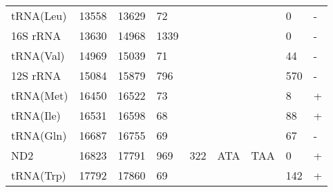 \documentclass[../DISSERTACAO_MAIN.tex]{subfiles}
\begin{document}
\begin{longtable}{llllllllllllllllllllll}
			tRNA(Leu)    & 13558          & \multicolumn{2}{l}{13629} & \multicolumn{2}{l}{72}         & \multicolumn{3}{l}{}                          & \multicolumn{3}{l}{}              & \multicolumn{3}{l}{}      & \multicolumn{3}{l}{0}           & \multicolumn{4}{l}{-}                  \\
			16S 				rRNA & 13630          & \multicolumn{2}{l}{14968} & \multicolumn{2}{l}{1339}       & \multicolumn{3}{l}{}                          & \multicolumn{3}{l}{}              & \multicolumn{3}{l}{}      & \multicolumn{3}{l}{0}           & \multicolumn{4}{l}{-}                  \\
			tRNA(Val)    & 14969          & \multicolumn{2}{l}{15039} & \multicolumn{2}{l}{71}         & \multicolumn{3}{l}{}                          & \multicolumn{3}{l}{}              & \multicolumn{3}{l}{}      & \multicolumn{3}{l}{44}          & \multicolumn{4}{l}{-}                  \\
			12S 				rRNA & 15084          & \multicolumn{2}{l}{15879} & \multicolumn{2}{l}{796}        & \multicolumn{3}{l}{}                          & \multicolumn{3}{l}{}              & \multicolumn{3}{l}{}      & \multicolumn{3}{l}{570}         & \multicolumn{4}{l}{-}                  \\
			tRNA(Met)    & 16450          & \multicolumn{2}{l}{16522} & \multicolumn{2}{l}{73}         & \multicolumn{3}{l}{}                          & \multicolumn{3}{l}{}              & \multicolumn{3}{l}{}      & \multicolumn{3}{l}{8}           & \multicolumn{4}{l}{+}                  \\
			tRNA(Ile)    & 16531          & \multicolumn{2}{l}{16598} & \multicolumn{2}{l}{68}         & \multicolumn{3}{l}{}                          & \multicolumn{3}{l}{}              & \multicolumn{3}{l}{}      & \multicolumn{3}{l}{88}          & \multicolumn{4}{l}{+}                  \\
			tRNA(Gln)    & 16687          & \multicolumn{2}{l}{16755} & \multicolumn{2}{l}{69}         & \multicolumn{3}{l}{}                          & \multicolumn{3}{l}{}              & \multicolumn{3}{l}{}      & \multicolumn{3}{l}{67}          & \multicolumn{4}{l}{-}                  \\
			ND2          & 16823          & \multicolumn{2}{l}{17791} & \multicolumn{2}{l}{969}        & \multicolumn{3}{l}{322}                       & \multicolumn{3}{l}{ATA}           & \multicolumn{3}{l}{TAA}   & \multicolumn{3}{l}{0}           & \multicolumn{4}{l}{+}                  \\
			tRNA(Trp)    & 17792          & \multicolumn{2}{l}{17860} & \multicolumn{2}{l}{69}         & \multicolumn{3}{l}{}                          & \multicolumn{3}{l}{}              & \multicolumn{3}{l}{}      & \multicolumn{3}{l}{142}         & \multicolumn{4}{l}{+}                  \\

\end{longtable}
\end{document}
